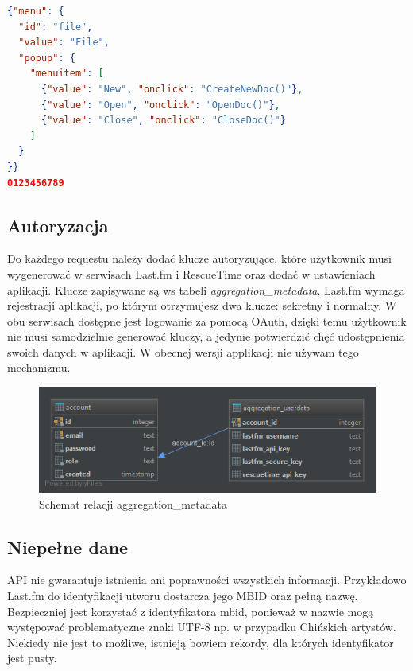 \documentclass[brudnopis]{xmgr}
\begin{document}
            \begin{lstlisting}[language=json,firstnumber=1]
{"menu": {
  "id": "file",
  "value": "File",
  "popup": {
    "menuitem": [
      {"value": "New", "onclick": "CreateNewDoc()"},
      {"value": "Open", "onclick": "OpenDoc()"},
      {"value": "Close", "onclick": "CloseDoc()"}
    ]
  }
}}
0123456789
            \end{lstlisting}


        \subsection*{Autoryzacja}

        Do każdego requestu należy dodać klucze autoryzujące,
        które użytkownik musi wygenerować w serwisach Last.fm i RescueTime \cite{rescuetime:apidoc-keymanagment} oraz dodać w ustawieniach aplikacji.
        Klucze zapisywane są ws tabeli \textit{aggregation\_metadata}.
        Last.fm wymaga rejestracji aplikacji, po którym otrzymujesz dwa klucze: sekretny i normalny.
        W obu serwisach dostępne jest logowanie za pomocą OAuth, dzięki temu użytkownik nie musi samodzielnie generować kluczy,
        a jedynie potwierdzić chęć udostępnienia swoich danych w aplikacji. W obecnej wersji applikacji nie używam tego mechanizmu.

        \begin{figure}
        	\includegraphics[width=\linewidth]{fig/db-aggregation-metadata.png}
        	\caption{Schemat relacji aggregation\_metadata}
        	\label{fig:}
        \end{figure}

        \subsection*{Niepełne dane}
        API nie gwarantuje istnienia ani poprawności wszystkich informacji.
        Przykładowo Last.fm do identyfikacji utworu dostarcza jego MBID oraz pełną nazwę.
        Bezpieczniej jest korzystać z identyfikatora mbid, ponieważ w nazwie mogą występować problematyczne znaki UTF-8 np. w przypadku Chińskich artystów.
        Niekiedy nie jest to możliwe, istnieją bowiem rekordy, dla których identyfikator jest pusty.
\end{document}
